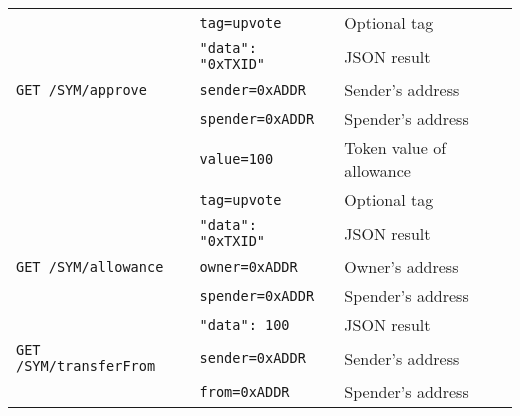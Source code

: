 \documentclass[12pt,a4paper, twocolumn]{article}
\begin{document}
\begin{table}[H]
\begin{tabular}{lll}
& \texttt{tag=upvote}                                                                                                                                   & Optional tag             \\
& \texttt{{"data": "0xTXID"}}                                                                                                                         & JSON result              \\
\texttt{GET /SYM/approve}      & \texttt{sender=0xADDR}                                                                                                                                & Sender’s address         \\
& \texttt{spender=0xADDR}                                                                                                                               & Spender’s address        \\
& \texttt{value=100}                                                                                                                                    & Token value of allowance \\
& \texttt{tag=upvote}                                                                                                                                   & Optional tag             \\
& \texttt{{"data": "0xTXID"}}                                                                                                                         & JSON result              \\
\texttt{GET /SYM/allowance}    & \texttt{owner=0xADDR}                                                                                                                                 & Owner’s address          \\
& \texttt{spender=0xADDR}                                                                                                                               & Spender’s address        \\
& \texttt{{"data": 100}}                                                                                                                              & JSON result              \\
\texttt{GET /SYM/transferFrom} & \texttt{sender=0xADDR}                                                                                                                                & Sender’s address         \\
& \texttt{from=0xADDR}                                                                                                                                  & Spender’s address        \\

\end{tabular}
\end{table}
\end{document}
